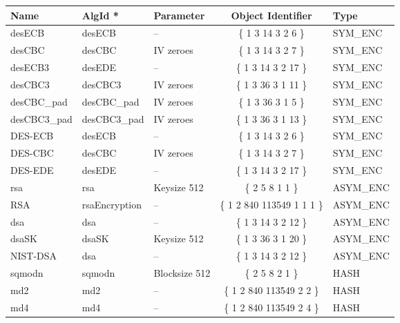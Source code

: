 {\small
\begin{tabular}{|l|l|l|c|l|} \hline
{\bf Name}      & {\bf AlgId *}      &  {\bf Parameter}  & {\bf Object Identifier}    & {\bf Type}   \\ \hline
desECB          & desECB             &  --               & \{ 1 3 14 3 2 6 \}         & SYM\_ENC \\
desCBC          & desCBC             &  IV zeroes        & \{ 1 3 14 3 2 7 \}         & SYM\_ENC \\
desECB3         & desEDE             &  --               & \{ 1 3 14 3 2 17 \}        & SYM\_ENC \\
desCBC3         & desCBC3            &  IV zeroes        & \{ 1 3 36 3 1 11 \}        & SYM\_ENC \\
desCBC\_pad     & desCBC\_pad        &  IV zeroes        & \{ 1 3 36 3 1 5 \}         & SYM\_ENC \\
desCBC3\_pad    & desCBC3\_pad       &  IV zeroes        & \{ 1 3 36 3 1 13 \}        & SYM\_ENC \\
DES-ECB         & desECB             &  --               & \{ 1 3 14 3 2 6 \}         & SYM\_ENC \\
DES-CBC         & desCBC             &  IV zeroes        & \{ 1 3 14 3 2 7 \}         & SYM\_ENC \\
DES-EDE         & desEDE             &  --               & \{ 1 3 14 3 2 17 \}        & SYM\_ENC \\ rsa             & rsa                &  Keysize 512      & \{ 2 5 8 1 1 \}            & ASYM\_ENC \\
RSA             & rsaEncryption      &  --               & \{ 1 2 840 113549 1 1 1 \} & ASYM\_ENC \\
dsa             & dsa                &  --               & \{ 1 3 14 3 2 12 \}        & ASYM\_ENC \\
dsaSK           & dsaSK              &  Keysize 512      & \{ 1 3 36 3 1 20 \}        & ASYM\_ENC \\
NIST-DSA        & dsa                &  --               & \{ 1 3 14 3 2 12 \}        & ASYM\_ENC \\
sqmodn          & sqmodn             &  Blocksize 512    & \{ 2 5 8 2 1 \}            & HASH \\
md2             & md2                &  --               & \{ 1 2 840 113549 2 2 \}   & HASH \\
md4             & md4                &  --               & \{ 1 2 840 113549 2 4 \}   & HASH \\

\end{tabular}}
